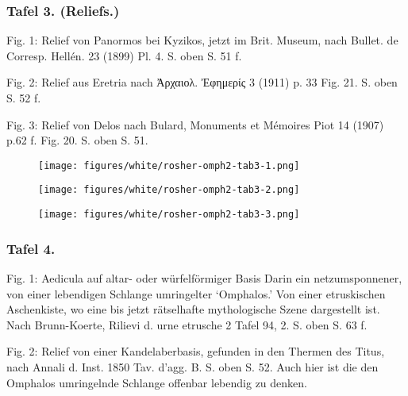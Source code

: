 \documentclass[a4paper, 11pt, oneside]{article}
\begin{document}
\subsubsection{Tafel 3. (Reliefs.)}

Fig. 1: Relief von Panormos bei Kyzikos, jetzt im Brit. Museum, nach Bullet. de Corresp. Hellén. 23 (1899) Pl. 4. S. oben S. 51 f.

Fig. 2: Relief aus Eretria nach Ἀρχαιολ. Ἐφημερίς 3 (1911) p. 33 Fig. 21. S. oben S. 52 f.

Fig. 3: Relief von Delos nach Bulard, Monuments et Mémoires Piot 14 (1907) p.62 f. Fig. 20. S. oben S. 51.
\clearpage
\begin{landscape}
\vspace*{\fill}
\begin{figure}[H]
\centering
\texttt{[image: figures/white/rosher-omph2-tab3-1.png]}
\caption{}
\end{figure}
\vspace*{\fill}
\clearpage
\vspace*{\fill}
\begin{figure}[H]
\centering
\texttt{[image: figures/white/rosher-omph2-tab3-2.png]}
\caption{}
\end{figure}
\vspace*{\fill}
\clearpage
\vspace*{\fill}
\begin{figure}[H]
\centering
\texttt{[image: figures/white/rosher-omph2-tab3-3.png]}
\caption{}
\end{figure}
\vspace*{\fill}
\clearpage
\end{landscape}
\subsubsection{Tafel 4.}

Fig. 1: Aedicula auf altar- oder würfelförmiger Basis Darin ein netzumsponnener, von einer lebendigen Schlange umringelter `Omphalos.' Von einer etruskischen Aschenkiste, wo eine bis jetzt rätselhafte mythologische Szene dargestellt ist. Nach Brunn-Koerte, Rilievi d. urne etrusche 2 Tafel 94, 2. S. oben S. 63 f.

Fig. 2: Relief von einer Kandelaberbasis, gefunden in den Thermen des Titus, nach Annali d. Inst. 1850 Tav. d'agg. B. S. oben S. 52. Auch hier ist die den Omphalos umringelnde Schlange offenbar lebendig zu denken.
\end{document}
